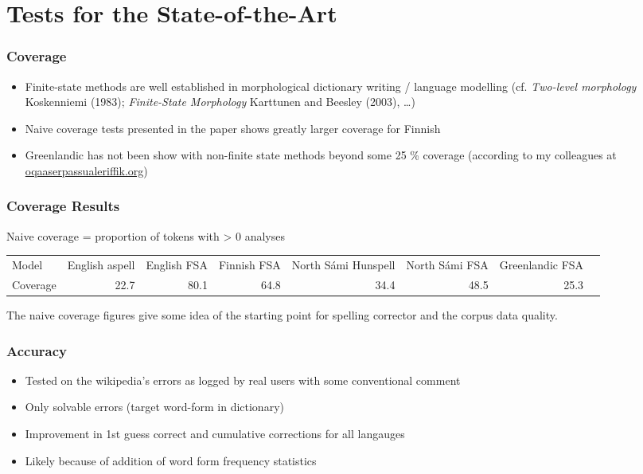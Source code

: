 \documentclass[t,12pt]{beamer}
\begin{document}
\section{Tests for the State-of-the-Art}

\begin{frame}
    \frametitle{Coverage}
    \begin{itemize}
        \item Finite-state methods are well established in morphological
            dictionary writing / language modelling (cf. \emph{Two-level
            morphology} Koskenniemi (1983); \emph{Finite-State Morphology}
            Karttunen and Beesley (2003), \ldots)
        \item Naive coverage tests presented in the paper shows greatly
            larger coverage for Finnish
        \item Greenlandic has not been show with non-finite state methods
            beyond some 25 \% coverage (according to my colleagues at
            \url{oqaaserpassualeriffik.org})
    \end{itemize}
\end{frame}

\begin{frame}
    \frametitle{Coverage Results}
    Naive coverage = proportion of tokens with > 0 analyses
    \begin{tabular}{l|rrrrrrr}
        Model & English aspell & English FSA & Finnish FSA & North Sámi Hunspell & North Sámi FSA & Greenlandic FSA \\
    Coverage & 22.7 & 80.1 & 64.8 & 34.4 & 48.5 & 25.3 \\
    \end{tabular}
    The naive coverage figures give some idea of the starting point for
    spelling corrector and the corpus data quality.
\end{frame}

\begin{frame}
    \frametitle{Accuracy}
    \begin{itemize}
        \item Tested on the wikipedia's errors as logged by real users with
            some conventional comment
        \item Only solvable errors (target word-form in dictionary)
        \item Improvement in 1st guess correct and cumulative corrections
            for all langauges
        \item Likely because of addition of word form frequency statistics
    \end{itemize}
\end{frame}
\end{document}
